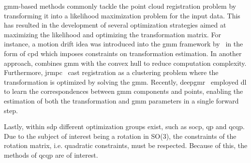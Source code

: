 
\gls{gmm}-based methods commonly tackle the point cloud registration problem by transforming it into a likelihood maximization problem for the input data. This has resulted in the development of several optimization strategies aimed at maximizing the likelihood and optimizing the transformation matrix. For instance, a motion drift idea was introduced into the \gls{gmm} framework by~\cite{information-retrieval-for-music-and-motion} in the form of \gls{cpd} which imposes constraints on transformation estimation. In another approach,\cite{convex-hull-indexed-gaussian-mixture-model-ch-gmm-for-3d-point-set-registration} combines \gls{gmm} with the convex hull to reduce computation complexity. Furthermore, \gls{jrmpc}~\cite{a-generative-model-for-the-joint-registration-of-multiple-point-sets} cast registration as a clustering problem where the transformation is optimized by solving the \gls{gmm}. Recently, \gls{deepgmr}~\cite{deepgmr:-learning-latent-gaussian-mixture-models-for-registration} employed \gls{dl} to learn the correspondences between \gls{gmm} components and points, enabling the estimation of both the transformation and \gls{gmm} parameters in a single forward step. \medskip

Lastly, within \gls{sdp} different optimization groups exist, such as \gls{socp}, \gls{qp} and \gls{qcqp}. Due to the subject of interest being a rotation in SO(\num{3}), the constraints of the rotation matrix, i.e. quadratic constraints, must be respected. Because of this, the methods of \gls{qcqp} are of interest. \medskip

